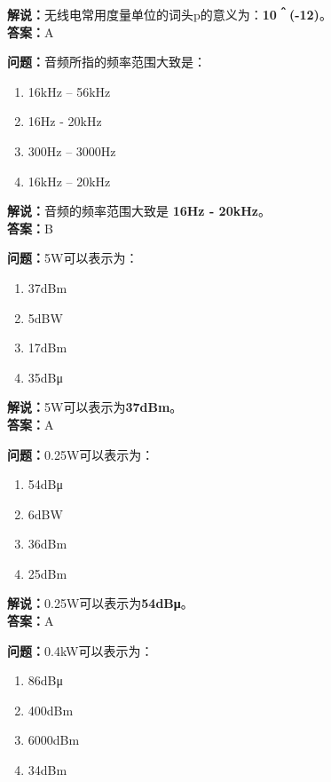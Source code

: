 \textbf{解说：}无线电常用度量单位的词头p的意义为：\textbf{10＾(-12)}。\\\textbf{答案：}A



\textbf{问题：}音频所指的频率范围大致是：

\begin{enumerate}[label=\Alph*), leftmargin=1cm]
	\item 16kHz – 56kHz
	\item 16Hz - 20kHz
	\item 300Hz – 3000Hz
	\item 16kHz – 20kHz
\end{enumerate}

\textbf{解说：}音频的频率范围大致是 \textbf{16Hz - 20kHz}。\\\textbf{答案：}B%



\textbf{问题：}5W可以表示为：

\begin{enumerate}[label=\Alph*), leftmargin=1cm]
	\item 37dBm
	\item 5dBW
	\item 17dBm
	\item 35dBμ
\end{enumerate}

\textbf{解说：}5W可以表示为\textbf{37dBm}。\\\textbf{答案：}A %



\textbf{问题：}0.25W可以表示为：

\begin{enumerate}[label=\Alph*), leftmargin=1cm]
	\item 54dBμ
	\item 6dBW
	\item 36dBm
	\item 25dBm
\end{enumerate}

\textbf{解说：}0.25W可以表示为\textbf{54dBμ}。\\\textbf{答案：}A%



\textbf{问题：}0.4kW可以表示为：

\begin{enumerate}[label=\Alph*), leftmargin=1cm]
	\item 86dBμ
	\item 400dBm
	\item 6000dBm
	\item 34dBm
\end{enumerate}

